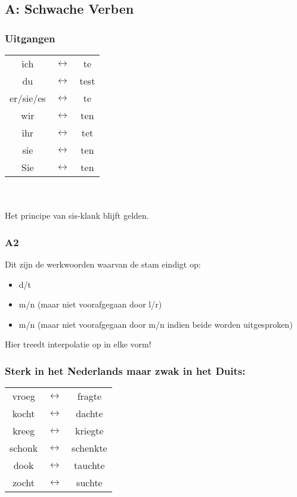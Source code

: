 \documentclass[main.tex]{subfiles}
\begin{document}
\subsection{A: Schwache Verben}
\subsubsection{Uitgangen}
\begin{tabular}{c c c}

ich & $\leftrightarrow$ & te \\ 

du & $\leftrightarrow$ & test \\ 

er/sie/es & $\leftrightarrow$ & te \\ 

wir & $\leftrightarrow$ & ten \\ 

ihr & $\leftrightarrow$ & tet \\ 

sie & $\leftrightarrow$ & ten \\ 
 
Sie & $\leftrightarrow$ & ten \\ 

\end{tabular} \\
\\
Het principe van sis-klank blijft gelden.
\subsubsection{A2}
Dit zijn de werkwoorden waarvan de stam eindigt op:
\begin{itemize}
\item d/t
\item m/n (maar niet voorafgegaan door l/r)
\item m/n (maar niet voorafgegaan door m/n indien beide worden uitgesproken)
\end{itemize}

Hier treedt interpolatie op in elke vorm!

\subsubsection{Sterk in het Nederlands maar zwak in het Duits:}
\begin{tabular}{ccc}
vroeg & $\leftrightarrow$ & fragte \\ 
kocht & $\leftrightarrow$ & dachte \\ 
kreeg & $\leftrightarrow$ & kriegte \\ 
schonk & $\leftrightarrow$ & schenkte \\ 
dook & $\leftrightarrow$ & tauchte \\ 
zocht & $\leftrightarrow$ & suchte \\ 
\end{tabular} 
\end{document}
